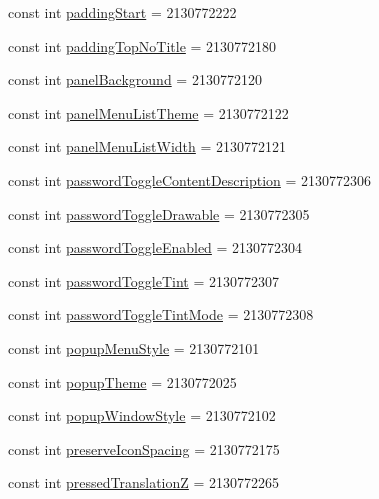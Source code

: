 \begin{CompactItemize}
const int \hyperlink{class__2doo_1_1_droid_1_1_resource_1_1_attribute_7c118c5508fb976f5226617d23a5e49a}{paddingStart} = 2130772222
\item 
const int \hyperlink{class__2doo_1_1_droid_1_1_resource_1_1_attribute_ffc6fe62fe220002ee7aef4cb9ec0dc9}{paddingTopNoTitle} = 2130772180
\item 
const int \hyperlink{class__2doo_1_1_droid_1_1_resource_1_1_attribute_dd8650776f7f151955d47b6ab628551d}{panelBackground} = 2130772120
\item 
const int \hyperlink{class__2doo_1_1_droid_1_1_resource_1_1_attribute_c87d5be9e07ff45aea8e21df7dce7dc1}{panelMenuListTheme} = 2130772122
\item 
const int \hyperlink{class__2doo_1_1_droid_1_1_resource_1_1_attribute_20076e7556589f2e90ff15d4ce23b74b}{panelMenuListWidth} = 2130772121
\item 
const int \hyperlink{class__2doo_1_1_droid_1_1_resource_1_1_attribute_17f9df6a36e146535814c79768b46727}{passwordToggleContentDescription} = 2130772306
\item 
const int \hyperlink{class__2doo_1_1_droid_1_1_resource_1_1_attribute_f509fb9d5d17fd17478d6dab376158a6}{passwordToggleDrawable} = 2130772305
\item 
const int \hyperlink{class__2doo_1_1_droid_1_1_resource_1_1_attribute_7de1f37258cb56112d240705619b7d1a}{passwordToggleEnabled} = 2130772304
\item 
const int \hyperlink{class__2doo_1_1_droid_1_1_resource_1_1_attribute_90beb43764a8f7dd72e0b7cebf8faa6c}{passwordToggleTint} = 2130772307
\item 
const int \hyperlink{class__2doo_1_1_droid_1_1_resource_1_1_attribute_98e71a3a6a4fe00ed94285dea34dc731}{passwordToggleTintMode} = 2130772308
\item 
const int \hyperlink{class__2doo_1_1_droid_1_1_resource_1_1_attribute_48f0124209d30f97034a10ca05f2b502}{popupMenuStyle} = 2130772101
\item 
const int \hyperlink{class__2doo_1_1_droid_1_1_resource_1_1_attribute_bd68c11fe17c46d5ad70236ecd203952}{popupTheme} = 2130772025
\item 
const int \hyperlink{class__2doo_1_1_droid_1_1_resource_1_1_attribute_cb724909297f336969ceac25428df69a}{popupWindowStyle} = 2130772102
\item 
const int \hyperlink{class__2doo_1_1_droid_1_1_resource_1_1_attribute_4702e093fd85dbbe65db141b798bb964}{preserveIconSpacing} = 2130772175
\item 
const int \hyperlink{class__2doo_1_1_droid_1_1_resource_1_1_attribute_43491b16f550f7a44655ac86b5e8ba20}{pressedTranslationZ} = 2130772265

\end{CompactItemize}
